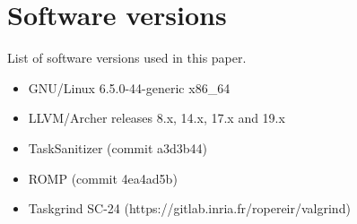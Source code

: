 \newpage

\appendix

\section{Software versions}
List of software versions used in this paper.
\begin{itemize}
    \item   GNU/Linux 6.5.0-44-generic x86\_64
    \item   LLVM/Archer releases 8.x, 14.x, 17.x and 19.x
    \item 	TaskSanitizer (commit a3d3b44)
    \item 	ROMP (commit 4ea4ad5b)
    \item   Taskgrind SC-24 (https://gitlab.inria.fr/ropereir/valgrind)
\end{itemize}

